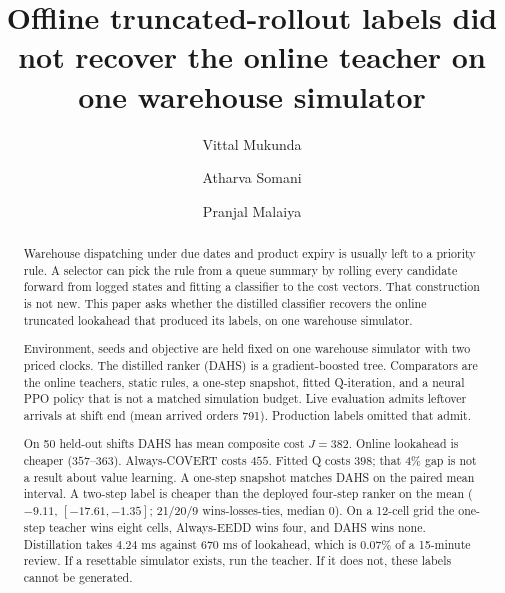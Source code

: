 \documentclass[review,3p,times]{elsarticle}
\newcounter{none}
\theoremstyle{definition}
\begin{document}
\begin{frontmatter}

\title{Offline truncated-rollout labels did not recover the online
teacher on one warehouse simulator}

\author[rvce]{Vittal Mukunda}
\author[rvce]{Atharva Somani}
\author[rvce]{Pranjal Malaiya}



\begin{abstract}
Warehouse dispatching under due dates and product expiry is usually left
to a priority rule. A selector can pick the rule from a queue summary by
rolling every candidate forward from logged states and fitting a
classifier to the cost vectors. That construction is not new. This paper
asks whether the distilled classifier recovers the online truncated
lookahead that produced its labels, on one warehouse simulator.

Environment, seeds and objective are held fixed on one warehouse
simulator with two priced clocks. The distilled ranker (DAHS) is a
gradient-boosted tree. Comparators are the online teachers, static
rules, a one-step snapshot, fitted Q-iteration, and a neural PPO policy
that is not a matched simulation budget. Live evaluation admits leftover
arrivals at shift end (mean arrived orders 791). Production labels
omitted that admit.

On 50 held-out shifts DAHS has mean composite cost \(J=382\). Online
lookahead is cheaper (\(357\)--\(363\)). Always-COVERT costs \(455\).
Fitted Q costs \(398\); that 4\% gap is not a result about value
learning. A one-step snapshot matches DAHS on the paired mean interval.
A two-step label is cheaper than the deployed four-step ranker on the
mean (\(-9.11\), \([-17.61,-1.35]\); 21/20/9 wins-losses-ties, median
0). On a 12-cell grid the one-step teacher wins eight cells, Always-EEDD
wins four, and DAHS wins none. Distillation takes \(4.24\) ms against
\(670\) ms of lookahead, which is \(0.07\%\) of a 15-minute review. If a
resettable simulator exists, run the teacher. If it does not, these
labels cannot be generated.
\end{abstract}


\end{frontmatter}
\end{document}
